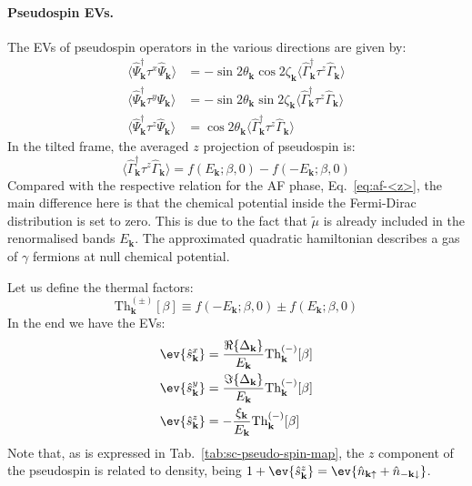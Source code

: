 \paragraph{Pseudospin EVs.}

The EVs of pseudospin operators in the various directions are given by:
\[
\begin{aligned}
	\langle \hat \Psi_\mathbf{k}^\dagger \tau^x \hat \Psi_\mathbf{k} \rangle &= -\sin 2\theta_\mathbf{k} \cos 2\zeta_\mathbf{k} \langle \hat \Gamma_\mathbf{k}^\dagger \tau^z \hat \Gamma_\mathbf{k} \rangle \\
	\langle \hat \Psi_\mathbf{k}^\dagger \tau^y \hat \Psi_\mathbf{k} \rangle &= -\sin 2\theta_\mathbf{k} \sin 2\zeta_\mathbf{k} \langle \hat \Gamma_\mathbf{k}^\dagger \tau^z \hat \Gamma_\mathbf{k} \rangle  \\
	\langle \hat \Psi_\mathbf{k}^\dagger \tau^z \hat \Psi_\mathbf{k} \rangle &= \cos 2\theta_\mathbf{k} \langle \hat \Gamma_\mathbf{k}^\dagger \tau^z \hat \Gamma_\mathbf{k} \rangle
\end{aligned}
\]
In the tilted frame, the averaged $z$ projection of pseudospin is:
\begin{equation}\label{eq:sc-<z>}
	\langle \hat \Gamma_\mathbf{k}^\dagger \tau^z \hat \Gamma_\mathbf{k} \rangle =
	f\left(
	E_\mathbf{k};\beta,0
	\right) - f\left(
	-E_\mathbf{k};\beta,0
	\right)
\end{equation}
Compared with the respective relation for the AF phase, Eq.~\eqref{eq:af-<z>}, the main difference here is that the chemical potential inside the Fermi-Dirac distribution is set to zero. This is due to the fact that $\tilde{\mu}$ is already included in the renormalised bands $E_\mathbf{k}$. The approximated quadratic hamiltonian describes a gas of $\gamma$ fermions at null chemical potential.

Let us define the thermal factors:
\begin{equation}\label{eq:sc-Th}
	\mathrm{Th}_\mathbf{k}^{(\pm)}[\beta] \equiv 
	f\left(
	-E_\mathbf{k};\beta,0
	\right) \pm f\left(
	E_\mathbf{k};\beta,0
	\right)
\end{equation}
In the end we have the EVs:
\begin{align}
	\ev{\hat s_\mathbf{k}^x} &= \frac{\Re \lbrace \Delta_\mathbf{k} \rbrace}{E_\mathbf{k}} \mathrm{Th}_\mathbf{k}^{(-)}[\beta] \label{eq:sc-hm-sx}\\
	\ev{\hat s_\mathbf{k}^y} &= \frac{\Im \lbrace \Delta_\mathbf{k} \rbrace}{E_\mathbf{k}} \mathrm{Th}_\mathbf{k}^{(-)}[\beta] \label{eq:sc-hm-sy}\\
	\ev{\hat s_\mathbf{k}^z} &=  -\frac{\xi_\mathbf{k}}{E_\mathbf{k}}  \mathrm{Th}_\mathbf{k}^{(-)}[\beta] \label{eq:sc-hm-sz}
\end{align}
Note that, as is expressed in Tab.~\ref{tab:sc-pseudo-spin-map}, the $z$ component of the pseudospin is related to density, being $1+\ev{\hat s_\mathbf{k}^z} = \ev{\hat n_{\mathbf{k}\uparrow}	+ \hat n_{-\mathbf{k}\downarrow}}$.

